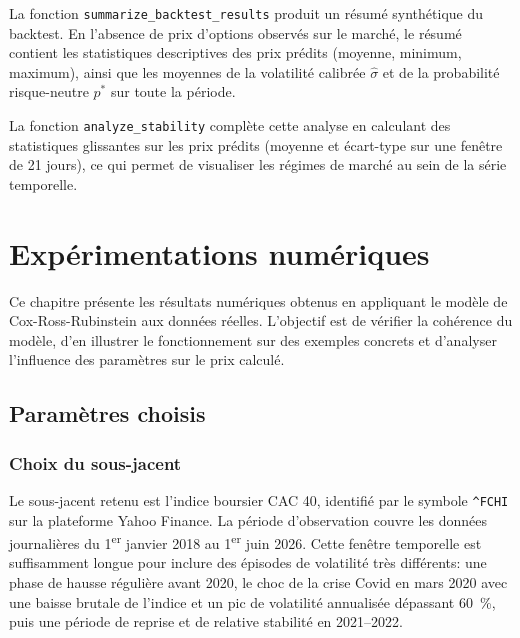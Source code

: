 \documentclass[11pt]{report}
\begin{document}
La fonction \texttt{summarize\_backtest\_results} produit un résumé synthétique
du backtest. En l'absence de prix d'options observés sur le marché,
le résumé contient les statistiques descriptives des prix prédits
(moyenne, minimum, maximum), ainsi que les moyennes de la volatilité
calibrée $\hat{\sigma}$ et de la probabilité risque-neutre $p^*$ sur
toute la période.

La fonction \texttt{analyze\_stability} complète cette analyse en calculant
des statistiques glissantes sur les prix prédits (moyenne et écart-type
sur une fenêtre de 21 jours), ce qui permet de visualiser les régimes de
marché au sein de la série temporelle.

\newpage


\chapter{Expérimentations numériques}

Ce chapitre présente les résultats numériques obtenus en appliquant le modèle
de Cox-Ross-Rubinstein aux données réelles. L'objectif est de vérifier la
cohérence du modèle, d'en illustrer le fonctionnement sur des exemples concrets
et d'analyser l'influence des paramètres sur le prix calculé.

\section{Paramètres choisis}

\subsection{Choix du sous-jacent}

Le sous-jacent retenu est l'indice boursier CAC 40, identifié par le symbole
\texttt{\^{}FCHI} sur la plateforme Yahoo Finance. La période d'observation
couvre les données journalières du 1\textsuperscript{er} janvier 2018 au
1\textsuperscript{er} juin 2026. Cette fenêtre temporelle est suffisamment longue
pour inclure des épisodes de volatilité très différents: une phase de hausse
régulière avant 2020, le choc de la crise Covid en mars 2020 avec une baisse
brutale de l'indice et un pic de volatilité annualisée dépassant 60~\%, puis
une période de reprise et de relative stabilité en 2021--2022.
\end{document}
